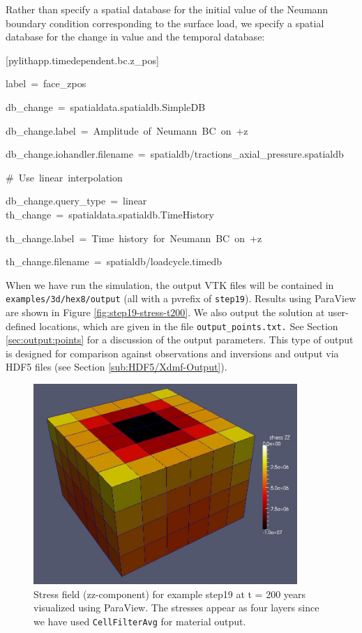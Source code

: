 Rather than specify a spatial database for the initial value of the
Neumann boundary condition corresponding to the surface load, we specify
a spatial database for the change in value and the temporal database:
\begin{lyxcode}
{[}pylithapp.timedependent.bc.z\_pos{]}

label~=~face\_zpos

db\_change~=~spatialdata.spatialdb.SimpleDB

db\_change.label~=~Amplitude~of~Neumann~BC~on~+z

db\_change.iohandler.filename~=~spatialdb/tractions\_axial\_pressure.spatialdb

\#~Use~linear~interpolation

db\_change.query\_type~=~linear~\\


th\_change~=~spatialdata.spatialdb.TimeHistory

th\_change.label~=~Time~history~for~Neumann~BC~on~+z

th\_change.filename~=~spatialdb/loadcycle.timedb
\end{lyxcode}
When we have run the simulation, the output VTK files will be contained
in \texttt{examples/3d/hex8/output} (all with a pvrefix of \texttt{step19}).
Results using ParaView are shown in Figure \vref{fig:step19-stress-t200}.
We also output the solution at user-defined locations, which are given
in the file \texttt{output\_points.txt.} See Section \vref{sec:output:points}
for a discussion of the output parameters. This type of output is
designed for comparison against observations and inversions and output
via HDF5 files (see Section \vref{sub:HDF5/Xdmf-Output}).

\begin{figure}
\begin{centering}
\includegraphics[width=10cm]{tutorials/3dhex8/figs/step19-stress_t200}
\par\end{centering}

\caption{Stress field (zz-component) for example step19 at t = 200 years visualized
using ParaView. The stresses appear as four layers since we have used
\texttt{CellFilterAvg} for material output.\label{fig:step19-stress-t200}}
\end{figure}

